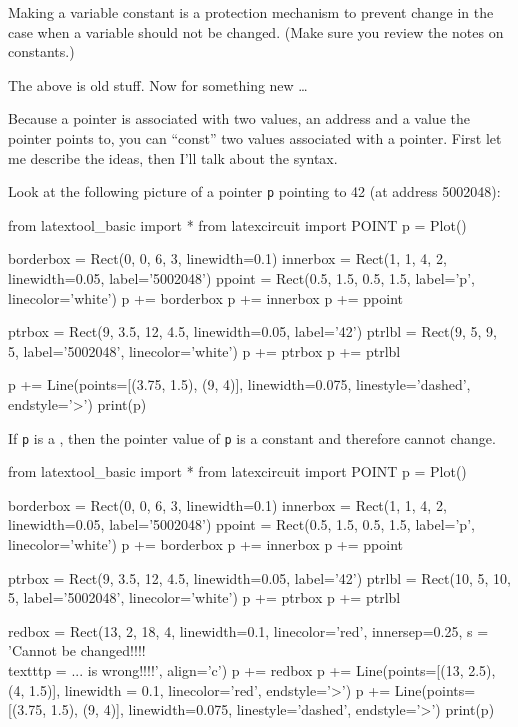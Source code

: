 Making a variable constant is a protection mechanism to prevent change in the case when a variable should not be changed. (Make sure you review the notes on constants.)

The above is old stuff. Now for something new \ldots{}

Because a pointer is associated with two values, an address and a value the pointer points to, you can ``const'' two values associated with a pointer. First let me describe the ideas, then I'll talk about the syntax.

Look at the following picture of a pointer \texttt{p} pointing to 42 (at address 5002048):

\begin{python}
from latextool_basic import *
from latexcircuit import POINT
p = Plot()

borderbox = Rect(0, 0, 6, 3, linewidth=0.1)
innerbox = Rect(1, 1, 4, 2, linewidth=0.05, label='5002048')
ppoint = Rect(0.5, 1.5, 0.5, 1.5, label='p', linecolor='white')
p += borderbox
p += innerbox
p += ppoint

ptrbox = Rect(9, 3.5, 12, 4.5, linewidth=0.05, label='42')
ptrlbl = Rect(9, 5, 9, 5, label='5002048', linecolor='white')
p += ptrbox
p += ptrlbl

p += Line(points=[(3.75, 1.5), (9, 4)], linewidth=0.075, linestyle='dashed', endstyle='>')
print(p)
\end{python}

If \texttt{p} is a , then the pointer value of \texttt{p} is a constant and therefore cannot change.

\begin{python}
from latextool_basic import *
from latexcircuit import POINT
p = Plot()

borderbox = Rect(0, 0, 6, 3, linewidth=0.1)
innerbox = Rect(1, 1, 4, 2, linewidth=0.05, label='5002048')
ppoint = Rect(0.5, 1.5, 0.5, 1.5, label='p', linecolor='white')
p += borderbox
p += innerbox
p += ppoint

ptrbox = Rect(9, 3.5, 12, 4.5, linewidth=0.05, label='42')
ptrlbl = Rect(10, 5, 10, 5, label='5002048', linecolor='white')
p += ptrbox
p += ptrlbl

redbox = Rect(13, 2, 18, 4, linewidth=0.1, linecolor='red', innersep=0.25, s = 'Cannot be changed!!!! \\texttt{p = ...} is wrong!!!!', align='c')
p += redbox
p += Line(points=[(13, 2.5), (4, 1.5)], linewidth = 0.1, linecolor='red', endstyle='>')
p += Line(points=[(3.75, 1.5), (9, 4)], linewidth=0.075, linestyle='dashed', endstyle='>')
print(p)
\end{python}

